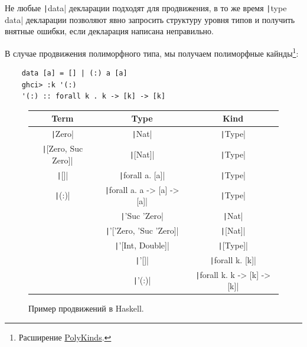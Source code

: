 Не любые \texttt|data| декларации подходят для продвижения, в то же время \texttt|type data| декларации позволяют явно запросить структуру уровня типов и получить внятные ошибки, если декларация написана неправильно.

В случае продвижения полиморфного типа, мы получаем полиморфные кайнды\footnote{Расширение \href{https://downloads.haskell.org/ghc/latest/docs/users_guide/exts/poly_kinds.html}{PolyKinds}.}:
\begin{verbatim}
    data [a] = [] | (:) a [a]
    ghci> :k '(:)
    '(:) :: forall k . k -> [k] -> [k]
\end{verbatim}

\begin{figure}[ht]
    \centering
    \begin{tabular}{|c|c|c|}
        \hline
        Term                                   & Type                                            & Kind                                            \\
        \hline
        \texttt|Zero|             & \texttt|Nat|                       & \texttt|Type|                      \\
        \texttt|[Zero, Suc Zero]| & \texttt|[Nat]|                     & \texttt|Type|                      \\
        \texttt|[]|               & \texttt|forall a. [a]|             & \texttt|Type|                      \\
        \texttt|(:)|              & \texttt|forall a. a -> [a] -> [a]| & \texttt|Type|                      \\
        & \texttt|'Suc 'Zero|                & \texttt|Nat|                       \\
        & \texttt|'['Zero, 'Suc 'Zero]|      & \texttt|[Nat]|                     \\
        & \texttt|'[Int, Double]|            & \texttt|[Type]|                    \\
        & \texttt|'[]|                       & \texttt|forall k. [k]|             \\
        & \texttt|'(:)|                      & \texttt|forall k. k -> [k] -> [k]| \\
        \hline
    \end{tabular}
    \caption{Пример продвижений в Haskell.}
    \label{fig:universes}
\end{figure}

